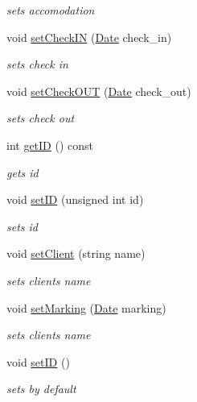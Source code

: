 \begin{DoxyCompactItemize}
\begin{DoxyCompactList}\small\item\em sets accomodation \end{DoxyCompactList}\item 
void \hyperlink{class_reservation_a2751145be1295ec9c031157dddb2590b}{set\+Check\+IN} (\hyperlink{class_date}{Date} check\+\_\+in)
\begin{DoxyCompactList}\small\item\em sets check in \end{DoxyCompactList}\item 
void \hyperlink{class_reservation_a3ecb41a114fa2771f64e8a0486ab7f35}{set\+Check\+O\+UT} (\hyperlink{class_date}{Date} check\+\_\+out)
\begin{DoxyCompactList}\small\item\em sets check out \end{DoxyCompactList}\item 
int \hyperlink{class_reservation_a0d411e0681fc74669776df87fb668983}{get\+ID} () const
\begin{DoxyCompactList}\small\item\em gets id \end{DoxyCompactList}\item 
void \hyperlink{class_reservation_a81e0f9725cb37ec2abb9669691ca4440}{set\+ID} (unsigned int id)
\begin{DoxyCompactList}\small\item\em sets id \end{DoxyCompactList}\item 
void \hyperlink{class_reservation_a8a876f7d0a3ac91836499f588a95b6b5}{set\+Client} (string name)
\begin{DoxyCompactList}\small\item\em sets clients name \end{DoxyCompactList}\item 
void \hyperlink{class_reservation_a2ee6742e30cdcba7868ad6189593a3a1}{set\+Marking} (\hyperlink{class_date}{Date} marking)
\begin{DoxyCompactList}\small\item\em sets clients name \end{DoxyCompactList}\item 
\hypertarget{class_reservation_afb750e7efb165312c1b08ba7eda3eb27}{}\label{class_reservation_afb750e7efb165312c1b08ba7eda3eb27} 
void \hyperlink{class_reservation_afb750e7efb165312c1b08ba7eda3eb27}{set\+ID} ()
\begin{DoxyCompactList}\small\item\em sets by default \end{DoxyCompactList}\item 

\end{DoxyCompactItemize}
